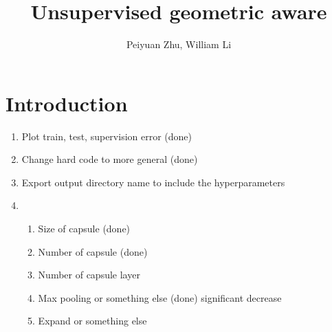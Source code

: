 \documentclass{article}
\author{Peiyuan Zhu, William Li}
\title{Unsupervised geometric aware}
\begin{document}
	\maketitle
	\section{Introduction}
	\begin{enumerate}
		\item Plot train, test, supervision error (done)
		\item Change hard code to more general (done)
		\item Export output directory name to include the hyperparameters
		\item 
		\begin{enumerate}
			\item Size of capsule (done)
			\item Number of capsule (done)
			\item Number of capsule layer
			\item Max pooling or something else (done) significant decrease
			\item Expand or something else
		\end{enumerate}
	\end{enumerate}
\end{document}
